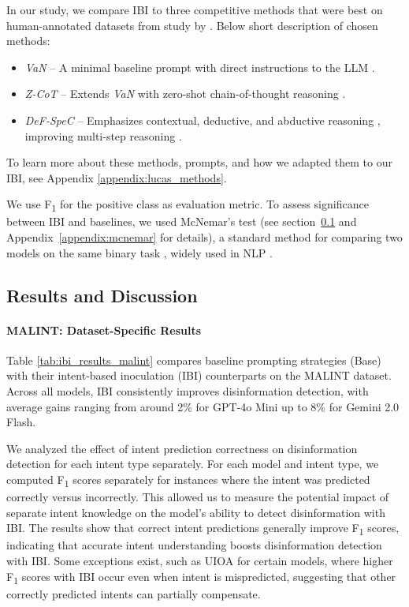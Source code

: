 \documentclass[11pt]{article}
\begin{document}
In our study, we compare IBI to three competitive methods that were best on human-annotated datasets from study by \citet{lucas2023fighting}. Below short description of chosen methods:
\begin{itemize}[nosep, leftmargin=*]
\item \textit{VaN} – A minimal baseline prompt with direct instructions to the LLM \cite{lucas2023fighting}.
\item \textit{Z-CoT} – Extends \textit{VaN} with zero-shot chain-of-thought reasoning \cite{kojima2022large}.
\item \textit{DeF-SpeC} – Emphasizes contextual, deductive, and abductive reasoning \cite{lucas2023fighting}, improving multi-step reasoning \cite{bang2023multitask}.
\end{itemize}
To learn more about these methods, prompts, and how we adapted them to our IBI, see Appendix \ref{appendix:lucas_methods}. 

We use F\textsubscript{1} for the positive class as evaluation metric. To assess significance between IBI and baselines, we used McNemar's test (see \mbox{section \ref{subsec:ibi_results_discussion}} and \mbox{Appendix~\ref{appendix:mcnemar}} for details), a standard method for comparing two models on the same binary task \cite{dietterich1998approximate, dror2018hitchhiker}, widely used in NLP \cite{blitzer2006domain, card2020little}.

\subsection{Results and Discussion}
\label{subsec:ibi_results_discussion}

\paragraph{MALINT: Dataset-Specific Results}
Table \ref{tab:ibi_results_malint} compares baseline prompting strategies (Base) with their intent-based inoculation (IBI) counterparts on the MALINT dataset. Across all models, IBI consistently improves disinformation detection, with average gains ranging from around 2\% for GPT-4o Mini up to 8\% for Gemini 2.0 Flash.

We analyzed the effect of intent prediction correctness on disinformation detection for each intent type separately. For each model and intent type, we computed F\textsubscript{1} scores separately for instances where the intent was predicted correctly versus incorrectly. This allowed us to measure the potential impact of separate intent knowledge on the model’s ability to detect disinformation with IBI. The results show that correct intent predictions generally improve F\textsubscript{1} scores, indicating that accurate intent understanding boosts disinformation detection with IBI. Some exceptions exist, such as UIOA for certain models, where higher F\textsubscript{1} scores with IBI occur even when intent is mispredicted, suggesting that other correctly predicted intents can partially compensate. 
\end{document}
